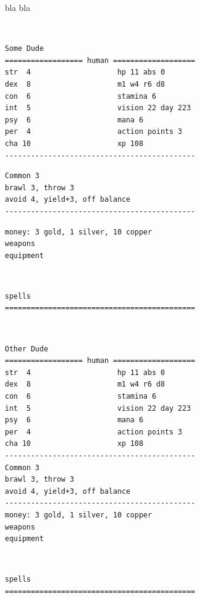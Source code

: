 bla bla

\

\small \begin{samepage} \begin{verbatim}
Some Dude
================== human ===================
str  4                    hp 11 abs 0
dex  8                    m1 w4 r6 d8
con  6                    stamina 6
int  5                    vision 22 day 223
psy  6                    mana 6
per  4                    action points 3
cha 10                    xp 108
--------------------------------------------
\end{verbatim} \end{samepage} \begin{samepage} \begin{verbatim}
Common 3
brawl 3, throw 3
avoid 4, yield+3, off balance
--------------------------------------------
\end{verbatim} \end{samepage} \goodbreak \begin{samepage} \begin{verbatim}
money: 3 gold, 1 silver, 10 copper
weapons
equipment
\end{verbatim} \end{samepage}   \   \goodbreak \begin{samepage} \begin{verbatim}
spells
============================================
\end{verbatim} \end{samepage} \normalsize

\

\goodbreak \small \begin{samepage} \begin{verbatim}
Other Dude
================== human ===================
str  4                    hp 11 abs 0
dex  8                    m1 w4 r6 d8
con  6                    stamina 6
int  5                    vision 22 day 223
psy  6                    mana 6
per  4                    action points 3
cha 10                    xp 108
--------------------------------------------
Common 3
brawl 3, throw 3
avoid 4, yield+3, off balance
--------------------------------------------
money: 3 gold, 1 silver, 10 copper
weapons
equipment
\end{verbatim} \end{samepage}   \   \goodbreak \begin{samepage} \begin{verbatim}
spells
============================================
\end{verbatim} \end{samepage} \normalsize


